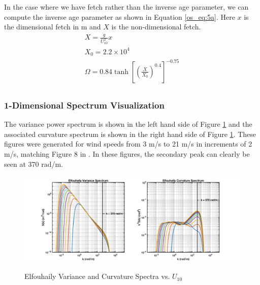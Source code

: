 In the case where we have fetch rather than the inverse age parameter, we can compute the inverse age parameter as shown in Equation \ref{os_eq:5a}. Here $x$ is the dimensional fetch in m and $X$ is the non-dimensional fetch.
\begin{equation}
\label{os_eq:5a}
\begin{gathered}
 X = \frac{g}{U_{10}^2}x\\
 X_0 = 2.2 \times 10^4 \\
 \Omega = 0.84\tanh\left[\left(\frac{X}{X_0} \right)^{0.4} \right]^{-0.75} \\
\end{gathered}
\end{equation}
\renewcommand{\baselinestretch}{2} \small\normalsize

\subsubsection{1-Dimensional Spectrum Visualization}
The variance power spectrum is shown in the left hand side of Figure \ref{os_fig:3} and the associated curvature spectrum is shown in the right hand side of Figure \ref{os_fig:3}. These figures were generated for wind speeds from 3 m/s to 21 m/s in increments of 2 m/s, matching Figure 8 in \cite{elfouhaily}. In these figures, the secondary peak can clearly be seen at 370 rad/m.
\begin{figure}[H]
  \begin{center}
\includegraphics[width=6in]{../media/Ocean_Surface/elf_variance_curvature_spectrum.png}
  \end{center}
  \renewcommand{\baselinestretch}{1} \small\normalsize
  \begin{quote}
    \caption[Elfouhaily Variance and Curvature Spectra vs. $U_{10}$]{Elfouhaily Variance and Curvature Spectra vs. $U_{10}$\label{os_fig:3}}
  \end{quote}
\end{figure}
\renewcommand{\baselinestretch}{2} \small\normalsize

